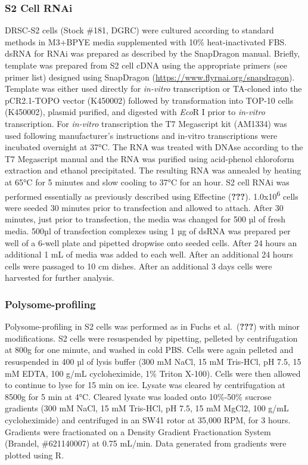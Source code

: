 \documentclass[12pt,oneside]{reedthesis}
\begin{document}
\hypertarget{s2-cell-rnai}{%
\subsubsection{S2 Cell RNAi}\label{s2-cell-rnai}}

DRSC-S2 cells (Stock \#181, DGRC) were cultured according to standard methods in M3+BPYE media supplemented with 10\% heat-inactivated FBS. dsRNA for RNAi was prepared as described by the SnapDragon manual. Briefly, template was prepared from S2 cell cDNA using the appropriate primers (see primer list) designed using SnapDragon (\url{https://www.flyrnai.org/snapdragon}). Template was either used directly for \emph{in-vitro} transcription or TA-cloned into the pCR2.1-TOPO vector (K450002) followed by transformation into TOP-10 cells (K450002), plasmid purified, and digested with \emph{Eco}R I prior to \emph{in-vitro} transcription. For \emph{in-vitro} transcription the T7 Megascript kit (AM1334) was used following manufacturer's instructions and in-vitro transcriptions were incubated overnight at 37°C. The RNA was treated with DNAse according to the T7 Megascript manual and the RNA was purified using acid-phenol chloroform extraction and ethanol precipitated. The resulting RNA was annealed by heating at 65°C for 5 minutes and slow cooling to 37°C for an hour. S2 cell RNAi was performed essentially as previously described using Effectine ({\textbf{???}}). 1.0x10\textsuperscript{6} cells were seeded 30 minutes prior to transfection and allowed to attach. After 30 minutes, just prior to transfection, the media was changed for 500 µl of fresh media. 500µl of transfection complexes using 1 µg of dsRNA was prepared per well of a 6-well plate and pipetted dropwise onto seeded cells. After 24 hours an additional 1 mL of media was added to each well. After an additional 24 hours cells were passaged to 10 cm dishes. After an additional 3 days cells were harvested for further analysis.

\hypertarget{polysome-profiling}{%
\subsubsection{Polysome-profiling}\label{polysome-profiling}}

Polysome-profiling in S2 cells was performed as in Fuchs et al.~({\textbf{???}}) with minor modifications. S2 cells were resuspended by pipetting, pelleted by centrifugation at 800g for one minute, and washed in cold PBS. Cells were again pelleted and resuspended in 400 µl of lysis buffer (300 mM NaCl, 15 mM Tris-HCl, pH 7.5, 15 mM EDTA, 100 g/mL cycloheximide, 1\% Triton X-100). Cells were then allowed to continue to lyse for 15 min on ice. Lysate was cleared by centrifugation at 8500g for 5 min at 4°C. Cleared lysate was loaded onto 10\%-50\% sucrose gradients (300 mM NaCl, 15 mM Tris-HCl, pH 7.5, 15 mM MgCl2, 100 g/mL cycloheximide) and centrifuged in an SW41 rotor at 35,000 RPM, for 3 hours. Gradients were fractionated on a Density Gradient Fractionation System (Brandel, \#621140007) at 0.75 mL/min. Data generated from gradients were plotted using R.
\end{document}
